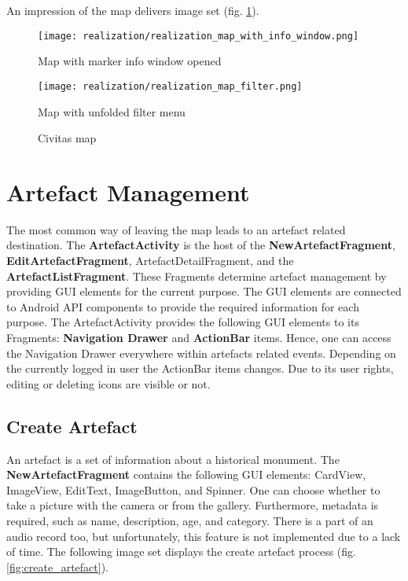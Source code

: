 An impression of the map delivers image set (fig. \ref{fig:civitas_map}).

\begin{figure}[!htb]
  \texttt{[image: realization/realization\_map\_with\_info\_window.png]}
  \caption{Map with marker info window opened}
  \label{fig:map_info_window}
\endminipage\hfill
{}
  \texttt{[image: realization/realization\_map\_filter.png]}
  \caption{Map with unfolded filter menu}
  \label{fig:map_filter}
\endminipage\hfill
\caption{Civitas map}
\label{fig:civitas_map}
\end{figure}


\section{Artefact Management}
The most common way of leaving the map leads to an artefact related destination. The \textbf{ArtefactActivity} is the host of the \textbf{NewArtefactFragment}, \textbf{EditArtefactFragment}, ArtefactDetailFragment, and the \textbf{ArtefactListFragment}. These Fragments determine artefact management by providing GUI elements for the current purpose. The GUI elements are connected to Android API components to provide the required information for each purpose. The ArtefactActivity provides the following GUI elements to its Fragments: \textbf{Navigation Drawer} and \textbf{ActionBar} items. Hence, one can access the Navigation Drawer everywhere within artefacts related events. Depending on the currently logged in user the ActionBar items changes. Due to its user rights, editing or deleting icons are visible or not.

\subsection{Create Artefact}
An artefact is a set of information about a historical monument. The \textbf{NewArtefactFragment} contains the following GUI elements: CardView, ImageView, EditText, ImageButton, and Spinner. 
One can choose whether to take a picture with the camera or from the gallery. Furthermore, metadata is required, such as name, description, age, and category. There is a part of an audio record too, but unfortunately, this feature is not implemented due to a lack of time.
The following image set displays the create artefact process (fig. \ref{fig:create_artefact}).


